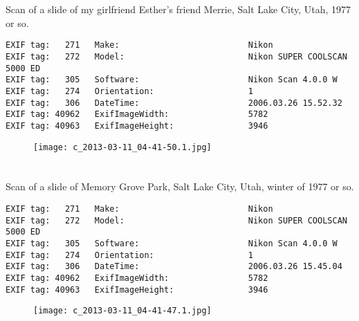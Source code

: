 \clearpage
\section{\protect{}}
\noindent Scan of a slide of my girlfriend Esther's friend Merrie, Salt Lake City, Utah, 1977 or so.
\noindent
\begin{lstlisting}
EXIF tag:   271   Make:                          Nikon
EXIF tag:   272   Model:                         Nikon SUPER COOLSCAN 5000 ED
EXIF tag:   305   Software:                      Nikon Scan 4.0.0 W
EXIF tag:   274   Orientation:                   1
EXIF tag:   306   DateTime:                      2006.03.26 15.52.32
EXIF tag: 40962   ExifImageWidth:                5782
EXIF tag: 40963   ExifImageHeight:               3946

\end{lstlisting}
\clearpage
\begin{figure}
\raggedleft
\texttt{[image: c\_2013-03-11\_04-41-50.1.jpg]}
\end{figure}


\clearpage
\section{\protect{}}
\noindent Scan of a slide of Memory Grove Park, Salt Lake City, Utah, winter of 1977 or so.
\noindent
\begin{lstlisting}
EXIF tag:   271   Make:                          Nikon
EXIF tag:   272   Model:                         Nikon SUPER COOLSCAN 5000 ED
EXIF tag:   305   Software:                      Nikon Scan 4.0.0 W
EXIF tag:   274   Orientation:                   1
EXIF tag:   306   DateTime:                      2006.03.26 15.45.04
EXIF tag: 40962   ExifImageWidth:                5782
EXIF tag: 40963   ExifImageHeight:               3946

\end{lstlisting}
\clearpage
\begin{figure}
\raggedleft
\texttt{[image: c\_2013-03-11\_04-41-47.1.jpg]}
\end{figure}


\clearpage
